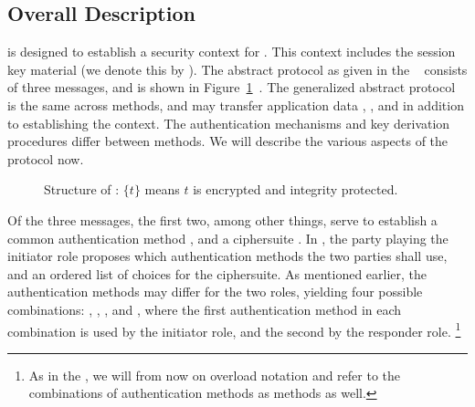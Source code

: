 \subsection{Overall Description}
\label{sec:description}
\mEdhoc{} is designed to establish a security context for \mOscore{}.
%
This context includes the session key material (we denote this by 
\mSessKey{}).
%
The abstract protocol as given in the \mSpec{}~\cite{} consists of three
messages, and is shown in Figure~\ref{fig:edhocFramework}~\cite{Norr21}.
%
The generalized abstract protocol is the same across methods,
and may transfer application data \mADone{}, \mADtwo{}, and \mADthree{} in
addition to establishing the context.
%
The authentication mechanisms and key derivation procedures differ between
methods.
%
We will describe the various aspects of the protocol now.
%
\begin{figure}[ht]
\centering
{}
    \caption{Structure of \mEdhoc{}: $\{t\}$ means $t$ is encrypted and integrity
protected.~\cite{Norr21}}
\label{fig:edhocFramework}
\end{figure}
%
Of the three messages, the first two, among other things, serve to establish a
common authentication method \mMethod{}, and a ciphersuite \mSuites{}.
%
In \mMethod{}, the party playing the initiator role proposes which
authentication methods the two parties shall use, and an ordered list
of choices for the ciphersuite.
%
As mentioned earlier, the authentication methods may differ for the two roles,
yielding four possible
combinations: \mSigSig{}, \mSigStat{}, \mStatSig{}, and \mStatStat{},
where the first authentication method in each combination is used by the
initiator role, and the second by the responder role.
\footnote{As in the \mSpec{}, we will from now on overload
notation and refer to the combinations of authentication methods as methods 
as
well.}
